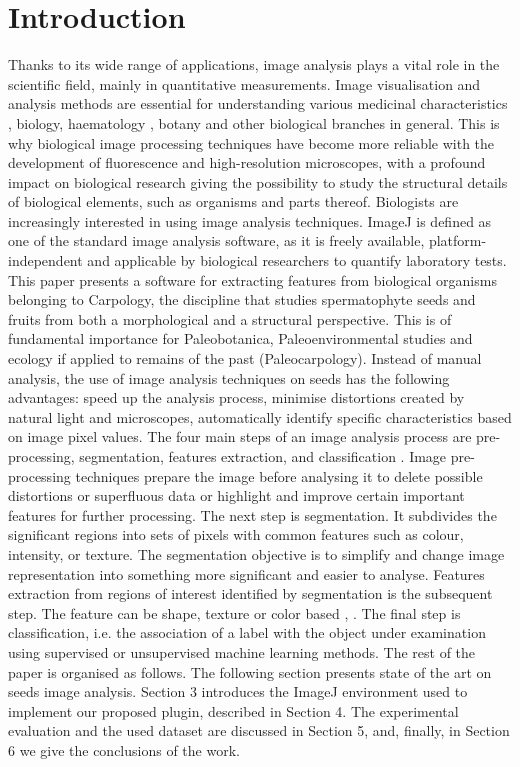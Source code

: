 \documentclass[a4paper,12pt]{article}
\begin{document}
\section{Introduction}
Thanks to its wide range of applications, image analysis plays a vital role in the scientific field, mainly in quantitative measurements. Image visualisation and analysis methods are essential for understanding various medicinal characteristics \cite{Dirub_2015}, biology, haematology \cite{Dirub_2020}, botany and other biological branches in general. This is why biological image processing techniques have become more reliable with the development of fluorescence and high-resolution microscopes, with a profound impact on biological research giving the possibility to study the structural details of biological elements, such as organisms and parts thereof.
Biologists are increasingly interested in using image analysis techniques. ImageJ \cite{ImageJ} is defined as one of the standard image analysis software, as it is freely available, platform-independent and applicable by biological researchers to quantify laboratory tests. This paper presents a software for extracting features from biological organisms belonging to Carpology, the discipline that studies spermatophyte seeds and fruits from both a morphological and a structural perspective. This is of fundamental importance for Paleobotanica, Paleoenvironmental studies and ecology if applied to remains of the past (Paleocarpology).
Instead of manual analysis, the use of image analysis techniques on seeds has the following advantages: speed up the analysis process, minimise distortions created by natural light and microscopes, automatically identify specific characteristics based on image pixel values. The four main steps of an image analysis process are pre-processing, segmentation, features extraction, and classification \cite{Gonz_2018}.
Image pre-processing techniques prepare the image before analysing it to delete possible distortions or superfluous data or highlight and improve certain important features for further processing. The next step is segmentation. It subdivides the significant regions into sets of pixels with common features such as colour, intensity, or texture. The segmentation objective is to simplify and change image representation into something more significant and easier to analyse. Features extraction from regions of interest identified by segmentation is the subsequent step. The feature can be shape, texture or color based \cite{Dirub_2015}, \cite{Dirub_2009}. The final step is classification, i.e. the association of a label with the object under examination using supervised or unsupervised machine learning methods. 
The rest of the paper is organised as follows. The following section presents state of the art on seeds image analysis. Section 3 introduces the ImageJ environment used to implement our proposed plugin, described in Section 4. The experimental evaluation and the used dataset are discussed in Section 5, and, finally, in Section 6 we give the conclusions of the work.
\end{document}
